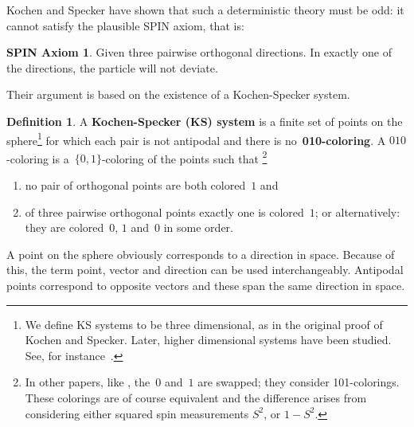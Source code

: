 \documentclass[adraft,copyright,creativecommons]{eptcs}
\newcommand{\keyword}[1]{\textbf{#1}}
\newcounter{main}
\theoremstyle{definition}
\newtheorem{dfn}[main]{Definition}
\newtheorem*{spin}{SPIN Axiom \cite{ck09}}
\theoremstyle{remark}
\begin{document}
Kochen and Specker have shown that such a deterministic theory must
be odd: it cannot satisfy the plausible SPIN axiom, that is:
\begin{spin}
    Given three pairwise orthogonal directions.
    In exactly one of the directions, the particle will not deviate.
\end{spin}
Their argument is based on the existence of a Kochen-Specker system.
\begin{dfn}
    A \keyword{Kochen-Specker (KS) system} is
    a finite set of points on the sphere\footnote{
            We define KS systems to be three dimensional,
            as in the original proof of Kochen and Specker.
            Later, higher dimensional systems have been studied.
            See, for instance~\cite[p.~201]{qtcm}.
        }
    for which each pair is not antipodal and
    there is no~\keyword{010-coloring}.
    A $010$-coloring is a~$\{0,1\}$-coloring of the points such that
        \footnote{
                In other papers, like \cite{aow11},
                the~$0$ and~$1$ are swapped; they consider 101-colorings.
                These colorings are of course equivalent and the
                difference arises from considering either squared
                spin measurements $S^2$, or $1-S^2$.
               	}
    \begin{enumerate}
        \item
            no pair of orthogonal points are both colored~$1$ and
        \item
            of three pairwise orthogonal points exactly one is colored~$1$;
            or alternatively: they are colored~$0$, $1$ and~$0$ in some order.
    \end{enumerate}
\end{dfn}
A point on the sphere obviously corresponds to a direction in space.
Because of this, the term point, vector and direction
can be used interchangeably. Antipodal points correspond to opposite
vectors and these span the same direction in space.
\end{document}
